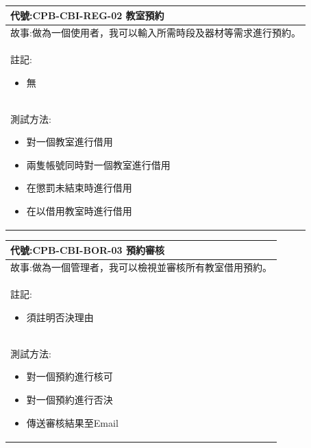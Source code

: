 \documentclass{article}
\begin{document}
\begin{table}[H]
	\begin{tabular}{| m{13cm} |}
		\hline
		代號:CPB-CBI-REG-02	教室預約          \\ \hline
		故事:做為一個使用者，我可以輸入所需時段及器材等需求進行預約。 \\	\hline
		註記:
		\begin{itemize}
			\item 無
		\end{itemize}                  \\ \hline
		測試方法:
		\begin{itemize}
			\item 對一個教室進行借用
			\item 兩隻帳號同時對一個教室進行借用
			\item 在懲罰未結束時進行借用
			\item 在以借用教室時進行借用
		\end{itemize}
		\\	\hline
	\end{tabular}
\end{table}

\begin{table}[H]
	\begin{tabular}{| m{13cm} |}
		\hline
		代號:CPB-CBI-BOR-03	預約審核       \\ \hline
		故事:做為一個管理者，我可以檢視並審核所有教室借用預約。 \\	\hline
		註記:
		\begin{itemize}
			\item 須註明否決理由
		\end{itemize}               \\ \hline
		測試方法:
		\begin{itemize}
			\item 對一個預約進行核可
			\item 對一個預約進行否決
			\item 傳送審核結果至Email
		\end{itemize}
		\\	\hline
	\end{tabular}
\end{table}
\end{document}
